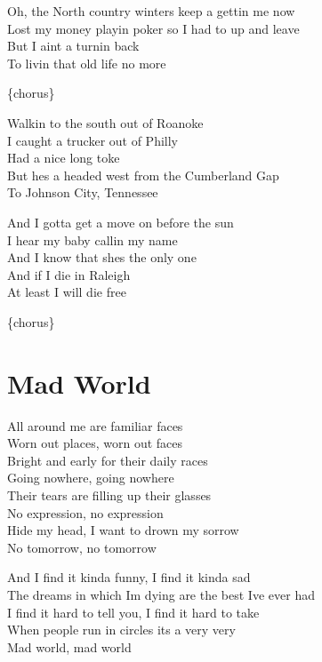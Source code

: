 \documentclass[
  letterpaper,
]{scrbook}
\begin{document}
Oh, the North country winters keep a gettin\textquotesingle{} me now\\
Lost my money playin\textquotesingle{} poker so I had to up and leave\\
But I ain\textquotesingle t a turnin\textquotesingle{} back\\
To livin\textquotesingle{} that old life no more

\{chorus\}

Walkin\textquotesingle{} to the south out of Roanoke\\
I caught a trucker out of Philly\\
Had a nice long toke\\
But he\textquotesingle s a headed west from the Cumberland Gap\\
To Johnson City, Tennessee

And I gotta get a move on before the sun\\
I hear my baby callin\textquotesingle{} my name\\
And I know that she\textquotesingle s the only one\\
And if I die in Raleigh\\
At least I will die free

\{chorus\}

\hypertarget{mad-world}{%
\chapter{Mad World}\label{mad-world}}

All around me are familiar faces\\
Worn out places, worn out faces\\
Bright and early for their daily races\\
Going nowhere, going nowhere\\
Their tears are filling up their glasses\\
No expression, no expression\\
Hide my head, I want to drown my sorrow\\
No tomorrow, no tomorrow

And I find it kinda funny, I find it kinda sad\\
The dreams in which I\textquotesingle m dying are the best
I\textquotesingle ve ever had\\
I find it hard to tell you, I find it hard to take\\
When people run in circles it\textquotesingle s a very very\\
Mad world, mad world
\end{document}
